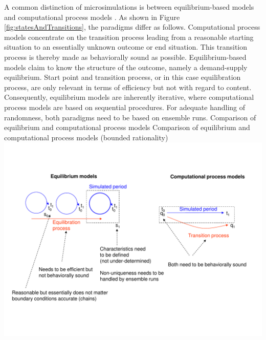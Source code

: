 A common distinction of microsimulations is between equilibrium-based models and computational process models \citep[][]{Hunt_TRBTDF_2006, ArentzeEtAl_Hensher_2001}. As shown in Figure \ref{fig:statesAndTransitions}, the paradigms differ as follows. Computational process models concentrate on the transition process leading from a reasonable starting situation to an essentially unknown outcome or end situation. This transition process is thereby made as behaviorally sound as possible. Equilibrium-based models claim to know the structure of the outcome, namely a demand-supply equilibrium. Start point and transition process, or in this case equilibration process, are only relevant in terms of efficiency but not with regard to content. Consequently, equilibrium models are inherently iterative, where computational process models are based on sequential procedures. For adequate handling of randomness, both paradigms need to be based on ensemble runs. 
%
\createfigure%
{Comparison of equilibrium and computational process models}%
{Comparison of equilibrium and computational process models (bounded rationality)}%
{\label{fig:statesAndTransitions}}%
{\includegraphics[width=1.3\textwidth,angle=90]{figures/StatesAndTransitions.pdf}}%
{}



